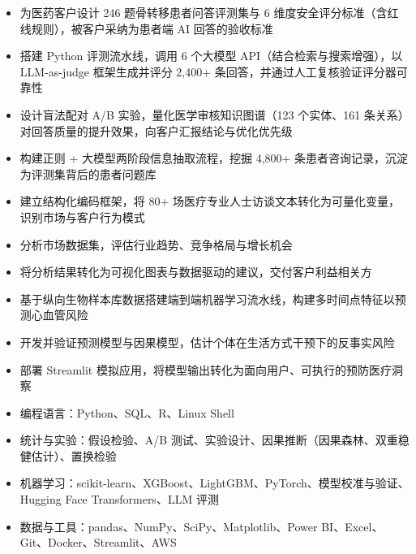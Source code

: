 \documentclass{zh_resume}
\begin{document}
\begin{itemize}
  \item 为医药客户设计 246 题骨转移患者问答评测集与 6 维度安全评分标准（含红线规则），被客户采纳为患者端 AI 回答的验收标准
  \item 搭建 Python 评测流水线，调用 6 个大模型 API（结合检索与搜索增强），以 LLM-as-judge 框架生成并评分 2,400+ 条回答，并通过人工复核验证评分器可靠性
  \item 设计盲法配对 A/B 实验，量化医学审核知识图谱（123 个实体、161 条关系）对回答质量的提升效果，向客户汇报结论与优化优先级
  \item 构建正则 + 大模型两阶段信息抽取流程，挖掘 4,800+ 条患者咨询记录，沉淀为评测集背后的患者问题库
\end{itemize}


\begin{itemize}
  \item 建立结构化编码框架，将 80+ 场医疗专业人士访谈文本转化为可量化变量，识别市场与客户行为模式
  \item 分析市场数据集，评估行业趋势、竞争格局与增长机会
  \item 将分析结果转化为可视化图表与数据驱动的建议，交付客户利益相关方
\end{itemize}



\begin{itemize}
  \item 基于纵向生物样本库数据搭建端到端机器学习流水线，构建多时间点特征以预测心血管风险
  \item 开发并验证预测模型与因果模型，估计个体在生活方式干预下的反事实风险
  \item 部署 Streamlit 模拟应用，将模型输出转化为面向用户、可执行的预防医疗洞察
\end{itemize}

\begin{itemize}[parsep=0.5ex]
  \item 编程语言：Python、SQL、R、Linux Shell
  \item 统计与实验：假设检验、A/B 测试、实验设计、因果推断（因果森林、双重稳健估计）、置换检验
  \item 机器学习：scikit-learn、XGBoost、LightGBM、PyTorch、模型校准与验证、Hugging Face Transformers、LLM 评测
  \item 数据与工具：pandas、NumPy、SciPy、Matplotlib、Power BI、Excel、Git、Docker、Streamlit、AWS
\end{itemize}
\end{document}
